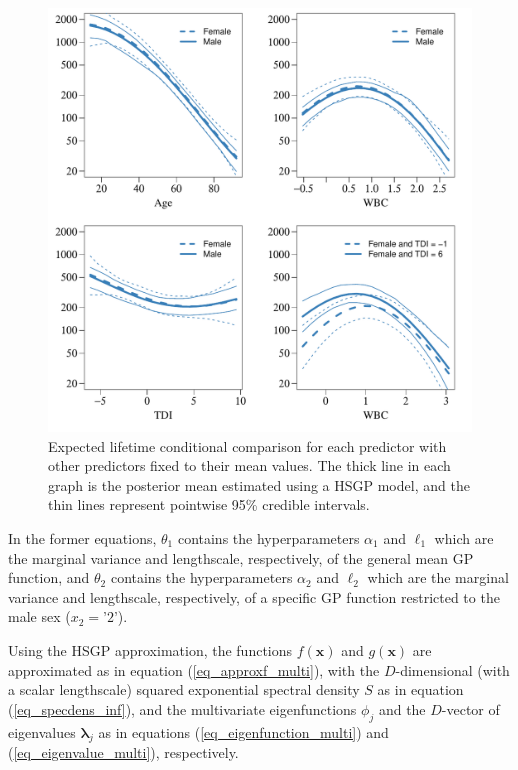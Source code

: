 \documentclass[onecolumn,a4paper,11pt]{article}
\begin{document}
\begin{figure}
\centering
\includegraphics[scale=0.70, trim = 0mm 0mm 0mm 0mm, clip]{ch5_fig21_posteriors_leukemia_02.pdf}
\caption{Expected lifetime conditional comparison for each predictor with other predictors fixed to their mean values. The thick line in each graph is the posterior mean estimated using a HSGP model, and the thin lines represent pointwise 95\% credible intervals.}
  \label{ch5_fig21_posteriors_leukemia}
\end{figure}

\noindent In the former equations, $\theta_1$ contains the hyperparameters $\alpha_1$ and $\ell_1$ which are the marginal variance and lengthscale, respectively, of the general mean GP function, and $\theta_2$ contains the hyperparameters $\alpha_2$ and $\ell_2$ which are the marginal variance and lengthscale, respectively, of a specific GP function restricted to the male sex ($x_2=\text{'}2\text{'}$).

Using the HSGP approximation, the functions $f(\bm{x})$ and $g(\bm{x})$ are approximated as in equation (\ref{eq_approxf_multi}), with the $D$-dimensional (with a scalar lengthscale) squared exponential spectral density $S$ as in equation (\ref{eq_specdens_inf}), and the multivariate eigenfunctions $\phi_j$ and the $D$-vector of eigenvalues $\bm{\lambda}_j$ as in equations (\ref{eq_eigenfunction_multi}) and  (\ref{eq_eigenvalue_multi}), respectively.
\end{document}
